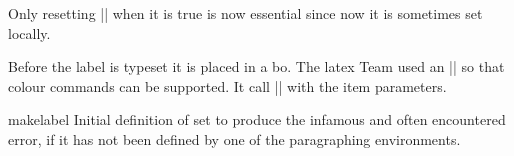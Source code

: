 \begin{texcode}{}{}
    Only resetting |\@nobreak| when it is true is now
    essential since now it is sometimes set locally.
    \begin{teX}
    \if@nobreak
      \@nobreakfalse
      \clubpenalty \@M
    \else
      \clubpenalty \@clubpenalty
      \everypar{}%
    \fi}%
    \end{teX}
    \begin{teX}
  \if@noitemarg
    \@noitemargfalse
    \if@nmbrlist
    \end{teX}
    \begin{teX}
      \@listctr
    \fi
  \fi
    \end{teX}
    
Before the label is typeset it is placed in a bo. The latex Team used an |\sbox| so that colour commands can be supported.
It call |\makelabel| with the item parameters.

    \begin{teXXX}
  \sbox{}%
  \global\setbox\@labels\hbox{%
    \unhbox\@labels
    \hskip \itemindent
    \hskip -\labelwidth 
    \hskip -\labelsep
    \ifdim \wd\@tempboxa >\labelwidth
       \box\@tempboxa
\end{teXXX}

\begin{teXXX}
%
    \else
      \hbox to%
    \fix
    \hskip \labelsep}%
  \ignorespaces}
    \end{teXXX}
 
 
 
 
 \begin{docCommand}{makelabel}{}
 Initial definition of  set to produce the infamous and often encountered error, if it
 has not been defined by one of the paragraphing environments.
 \end{docCommand}
 

\end{texcode}
